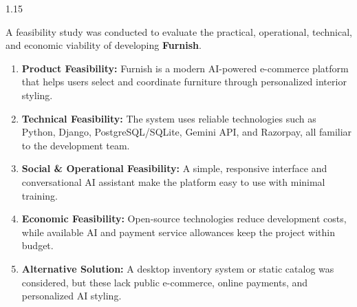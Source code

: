 \documentclass[12pt,a4paper]{article}
\begin{document}
\vspace{0.08in}

{\fontsize{13}{18}\selectfont
\begin{spacing}{1.15}

\noindent
A feasibility study was conducted to evaluate the practical, operational, technical, and economic viability of developing \textbf{Furnish}.

\vspace{0.10in}

\begin{enumerate}
    \setlength{\itemsep}{2pt}
    \setlength{\parskip}{0pt}
    \item \textbf{Product Feasibility:} Furnish is a modern AI-powered e-commerce platform that helps users select and coordinate furniture through personalized interior styling.

    \item \textbf{Technical Feasibility:} The system uses reliable technologies such as Python, Django, PostgreSQL/SQLite, Gemini API, and Razorpay, all familiar to the development team.

    \item \textbf{Social \& Operational Feasibility:} A simple, responsive interface and conversational AI assistant make the platform easy to use with minimal training.

    \item \textbf{Economic Feasibility:} Open-source technologies reduce development costs, while available AI and payment service allowances keep the project within budget.

    \item \textbf{Alternative Solution:} A desktop inventory system or static catalog was considered, but these lack public e-commerce, online payments, and personalized AI styling.
\end{enumerate}


\vspace{0.12in}


\end{spacing}}
\end{document}

